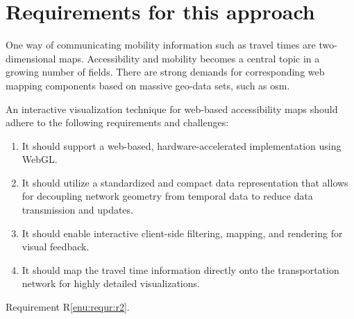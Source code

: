
\cleardoublepage              %
\chapter{Requirements for this approach}
  \label{chap:requr}

  One way of communicating mobility information such as travel times are
  two-dimensional maps. Accessibility and mobility becomes a central topic in a
  growing number of fields. There are strong demands for corresponding web
  mapping components based on massive geo-data sets, such as \acrshort{osm}.\par

  An interactive visualization technique for web-based accessibility maps should
  adhere to the following requirements and challenges:\par

  \begin{enumerate}[\label=({R}1)]
    \item \label{enu:requr:r1} It should support a web-based,
      hardware-accelerated implementation using WebGL. %
    \item \label{enu:requr:r2} It should utilize a standardized and compact
      data representation that allows for decoupling network geometry from
      temporal data to reduce data transmission and updates.
    \item \label{enu:requr:r3} It should enable interactive client-side
      filtering, mapping, and rendering for visual feedback.
    \item \label{enu:requr:r4} It should map the travel time information
      directly onto the transportation network for highly detailed
      visualizations.
  \end{enumerate}

  Requirement R\ref{enu:requr:r2}.

